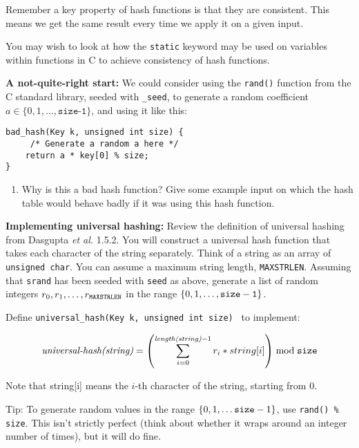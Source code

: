 \documentclass[11pt]{article}
\newcommand{\size}{{\tt size}}
\begin{document}
Remember a key property of hash functions is that they are consistent.
This means we get the same result every time we apply it on a given input.

You may wish to look at how the {\tt static} keyword may be used on variables
within functions in C to achieve consistency of hash functions.

\begin{description}
    \item {\bf A not-quite-right start:}
        We could consider using the {\tt rand()} function from the C standard library,
        seeded with {\tt \_seed},
        to generate a random coefficient $a \in \{0, 1, \ldots,
        \texttt{size-1}\}$,
        and using it like this:

\begin{verbatim}
bad_hash(Key k, unsigned int size) {
     /* Generate a random a here */
    return a * key[0] % size;
}
\end{verbatim}

\end{description}

\begin{enumerate}[resume]
    \item Why is this a bad hash function?
        Give some example input on which the hash table would behave badly if it was using this hash function.
\end{enumerate}

\begin{description}
    \item {\bf Implementing universal hashing: }
        Review the definition of universal hashing from Dasgupta {\it et al.} \/1.5.2.
        You will construct a universal hash function that takes each character of the string separately.
        Think of a string as an array of \texttt{unsigned char}.
        You can assume a maximum string length, {\tt MAXSTRLEN}.
        Assuming that {\tt srand} has been seeded with {\tt seed} as above,
        generate a list of random integers $r_0, r_1, \ldots, r_{{\tt MAXSTRLEN}}$
        in the range $\{0,1,\ldots,{\tt size-1}\}$.

        Define {\tt universal\_hash(Key k, unsigned int size) } to implement:

        $$\textit{universal-hash(string)} = \left( \sum_{i=0}^{ \textit{length(string)}-1} r_i * string[i] \right) \bmod \size $$

        Note that string[i] means the $i$-th character of the string,
        starting from 0.

        Tip: To generate random values in the range $\{0,1, \ldots {\tt size}-1 \}$,
        use {\tt rand() \%  size}.
        This isn't strictly perfect (think about whether it wraps around an integer number of times),
        but it will do fine.
\end{description}
\end{document}
